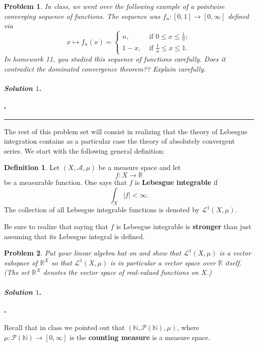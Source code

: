 \documentclass[reqno]{amsart}
\theoremstyle{plain}
\newtheorem{problem}{Problem}
\theoremstyle{definition}
\newtheorem{definition}{Definition}
\newenvironment{solution1}{\paragraph{\emph{Solution $1$}.}}{\hfill$\square$}
\begin{document}
\begin{problem}
In class, we went over the following example of a pointwise converging sequence of functions.  The sequence was $f_{n}:[0,1] \rightarrow [0,\infty]$ defined via
\begin{equation*}
x \mapsto f_{n}(x) = 
\begin{cases}
n,& \text{ if } 0 \le x \le \frac{1}{n} ; \\
1-x, & \text{ if } \frac{1}{n} \le x \le 1.
\end{cases}
\end{equation*}
In homework 11, you studied this sequence of functions carefully.  Does it contradict the dominated convergence theorem??  Explain carefully.
\end{problem}
\begin{solution1}

\end{solution1}

\noindent\rule{\linewidth}{0.4pt}

The rest of this problem set will consist in realizing that the theory of Lebesgue integration contains as a particular case the theory of absolutely convergent series.  We start with the following general definition:

\begin{definition}
Let $(X,\mathcal{A},\mu)$ be a measure space and let 
$$f: X \rightarrow \mathbb{R} $$
be a measurable function.  One says that $f$ is {\bfseries Lebesgue integrable} if 
$$\int_{X} |f| < \infty. $$
The collection of all Lebesgue integrable functions is denoted by $\mathcal{L}^{1}(X,\mu)$.
\end{definition}
Be sure to realize that saying that $f$ is Lebesgue integrable is {\bfseries stronger} than just assuming that its Lebesgue integral is defined.

\begin{problem}
Put your linear algebra hat on and show that $\mathcal{L}^{1}(X,\mu)$ is a vector subspace of $\mathbb{R}^{X}$ so that $\mathcal{L}^{1}(X,\mu)$ is in particular a vector space over $\mathbb{R}$ itself.  (The set $\mathbb{R}^{X}$ denotes the vector space of real-valued functions on $X$.)
\end{problem}
\begin{solution1}

\end{solution1}

Recall that in class we pointed out that $(\mathbb{N},\mathcal{P}(\mathbb{N}),\mu)$, where $\mu:\mathcal{P}(\mathbb{N}) \rightarrow [0,\infty]$ is the {\bfseries counting measure} is a measure space.
\end{document}
